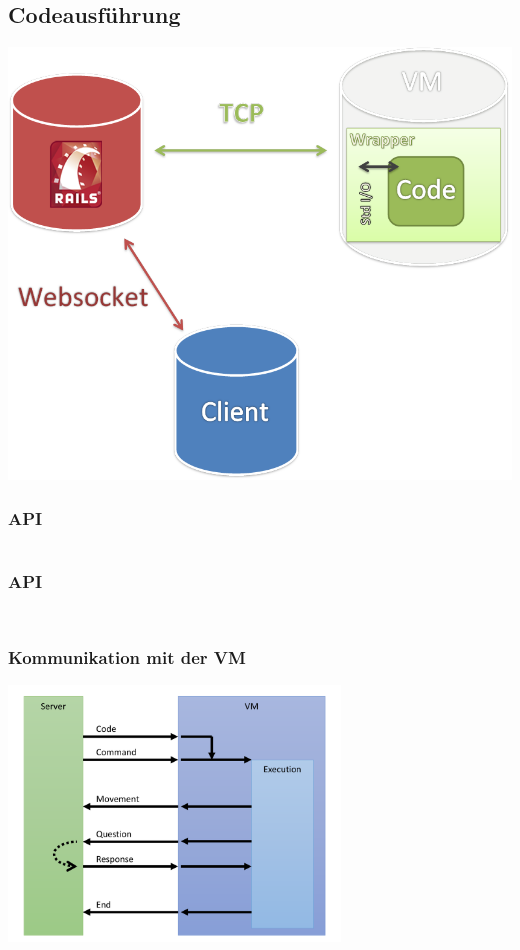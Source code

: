 \subsection{Codeausführung}

\begin{frame}
\begin{center}
	\includegraphics[scale=0.35]{overview}
\end{center}
\end{frame}

\begin{frame}
\frametitle{API}
\inputminted[linenos, numbersep=2pt, tabsize=4, frame=lines, label=move]{ruby}{vm/move.rb}
\end{frame}

\begin{frame}
\frametitle{API}
\inputminted[linenos, numbersep=2pt, tabsize=4, frame=lines, label=look]{ruby}{vm/look.rb}
\inputminted[linenos, numbersep=2pt, tabsize=4, frame=lines, label=response]{ruby}{vm/look_response.rb}
\end{frame}

\begin{frame}
\frametitle{Kommunikation mit der VM}
\begin{center}
\includegraphics[width=250pt]{vm/vm.pdf}
\end{center}
\end{frame}